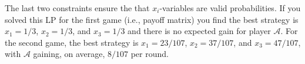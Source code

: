 The last two constraints ensure the that $x_i$-variables are valid probabilities. If you solved this LP for the first game (i.e., payoff matrix) you find the best strategy is $x_1 = 1/3$, $x_2 = 1/3$, and $x_3 = 1/3$ and there is no expected gain for player $\mathcal{A}$.  For the second game, the best strategy is $x_1 = 23/107$, $x_2 = 37/107$, and $x_3 = 47/107$, with $\mathcal{A}$ gaining, on average, $8/107$ per round.
